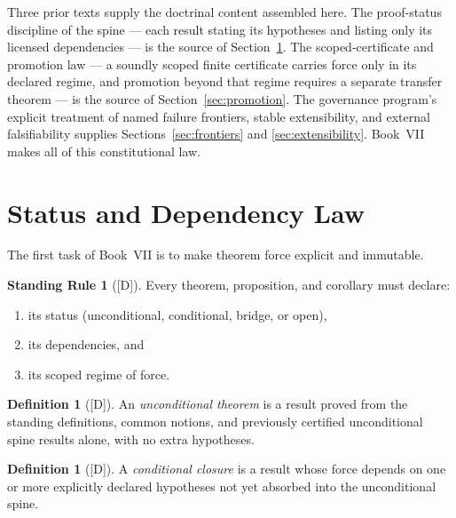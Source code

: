 \documentclass[12pt,oneside]{amsbook}
\theoremstyle{plain}
\theoremstyle{definition}
\newtheorem{definition}[theorem]{Definition}
\newtheorem{standingrule}[theorem]{Standing Rule}
\theoremstyle{remark}
\newcommand{\status}[1]{\textup{[#1]}}
\begin{document}
Three prior texts supply the doctrinal content assembled here.  The
proof-status discipline of the spine --- each result stating its
hypotheses and listing only its licensed dependencies --- is the source
of Section~\ref{sec:status}.  The scoped-certificate and promotion law
--- a soundly scoped finite certificate carries force only in its
declared regime, and promotion beyond that regime requires a separate
transfer theorem --- is the source of Section~\ref{sec:promotion}.
The governance program's explicit treatment of named failure frontiers,
stable extensibility, and external falsifiability supplies
Sections~\ref{sec:frontiers} and \ref{sec:extensibility}.  Book~VII
makes all of this constitutional law.

\section{Status and Dependency Law}
\label{sec:status}

The first task of Book~VII is to make theorem force explicit and
immutable.

\begin{standingrule}[\status{D}]\label{sr:declare-status}
Every theorem, proposition, and corollary must declare:
\begin{enumerate}[label=\textup{(\arabic*)}]
  \item its status (unconditional, conditional, bridge, or open),
  \item its dependencies, and
  \item its scoped regime of force.
\end{enumerate}
\end{standingrule}

\begin{definition}[\status{D}]\label{def:unconditional}
An \emph{unconditional theorem} is a result proved from the standing
definitions, common notions, and previously certified unconditional
spine results alone, with no extra hypotheses.
\end{definition}

\begin{definition}[\status{D}]\label{def:conditional}
A \emph{conditional closure} is a result whose force depends on one or
more explicitly declared hypotheses not yet absorbed into the
unconditional spine.
\end{definition}
\end{document}
